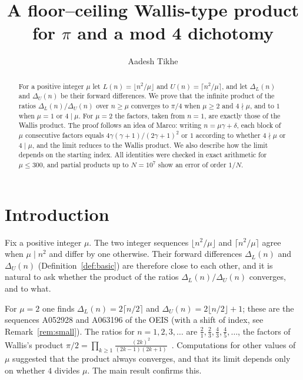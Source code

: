 \documentclass{amsart}
\theoremstyle{definition}
\theoremstyle{remark}
\newcommand{\DL}{\Delta_L}
\newcommand{\DU}{\Delta_U}
\begin{document}
\title[A floor--ceiling Wallis-type product]{A floor--ceiling Wallis-type product for $\pi$ and a mod 4 dichotomy}

\author{Aadesh Tikhe}
\address{Sardar Patel Institute of Technology (SPIT), Mumbai, India}


\begin{abstract}
For a positive integer $\mu$ let $L(n)=\lfloor n^2/\mu\rfloor$ and $U(n)=\lceil n^2/\mu\rceil$, and let $\DL(n)$ and $\DU(n)$ be their forward differences. We prove that the infinite product of the ratios $\DL(n)/\DU(n)$ over $n\ge\mu$ converges to $\pi/4$ when $\mu\ge 2$ and $4\nmid\mu$, and to $1$ when $\mu=1$ or $4\mid\mu$. For $\mu=2$ the factors, taken from $n=1$, are exactly those of the Wallis product. The proof follows an idea of Marco: writing $n=\mu\gamma+\delta$, each block of $\mu$ consecutive factors equals $4\gamma(\gamma+1)/(2\gamma+1)^2$ or $1$ according to whether $4\nmid\mu$ or $4\mid\mu$, and the limit reduces to the Wallis product. We also describe how the limit depends on the starting index. All identities were checked in exact arithmetic for $\mu\le 300$, and partial products up to $N=10^7$ show an error of order $1/N$.
\end{abstract}

\maketitle

\section{Introduction}

Fix a positive integer $\mu$. The two integer sequences $\lfloor n^2/\mu\rfloor$ and $\lceil n^2/\mu\rceil$ agree when $\mu\mid n^2$ and differ by one otherwise. Their forward differences $\DL(n)$ and $\DU(n)$ (Definition~\ref{def:basic}) are therefore close to each other, and it is natural to ask whether the product of the ratios $\DL(n)/\DU(n)$ converges, and to what.

For $\mu=2$ one finds $\DL(n)=2\lceil n/2\rceil$ and $\DU(n)=2\lfloor n/2\rfloor+1$; these are the sequences A052928 and A063196 of the OEIS (with a shift of index, see Remark~\ref{rem:small}). The ratios for $n=1,2,3,\dots$ are $\tfrac21,\tfrac23,\tfrac43,\tfrac45,\dots$, the factors of Wallis's product $\pi/2=\prod_{k\ge1}\frac{(2k)^2}{(2k-1)(2k+1)}$~\cite{wallis_wolfram}. Computations for other values of $\mu$ suggested that the product always converges, and that its limit depends only on whether $4$ divides $\mu$. The main result confirms this.
\end{document}
